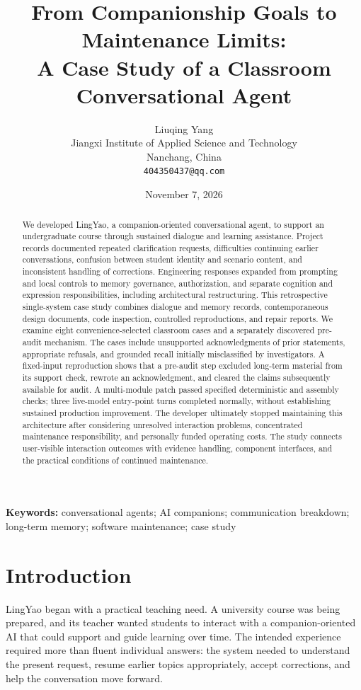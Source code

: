 \documentclass[11pt,a4paper]{article}
\title{From Companionship Goals to Maintenance Limits:\\
 A Case Study of a Classroom Conversational Agent}
\author{Liuqing Yang\\
 Jiangxi Institute of Applied Science and Technology\\
 Nanchang, China\\
 \texttt{404350437@qq.com}}
\date{November 7, 2026}
\begin{document}
\maketitle

\begin{abstract}
We developed LingYao, a companion-oriented conversational agent, to support an undergraduate course through sustained dialogue and learning assistance. Project records documented repeated clarification requests, difficulties continuing earlier conversations, confusion between student identity and scenario content, and inconsistent handling of corrections. Engineering responses expanded from prompting and local controls to memory governance, authorization, and separate cognition and expression responsibilities, including architectural restructuring. This retrospective single-system case study combines dialogue and memory records, contemporaneous design documents, code inspection, controlled reproductions, and repair reports. We examine eight convenience-selected classroom cases and a separately discovered pre-audit mechanism. The cases include unsupported acknowledgments of prior statements, appropriate refusals, and grounded recall initially misclassified by investigators. A fixed-input reproduction shows that a pre-audit step excluded long-term material from its support check, rewrote an acknowledgment, and cleared the claims subsequently available for audit. A multi-module patch passed specified deterministic and assembly checks; three live-model entry-point turns completed normally, without establishing sustained production improvement. The developer ultimately stopped maintaining this architecture after considering unresolved interaction problems, concentrated maintenance responsibility, and personally funded operating costs. The study connects user-visible interaction outcomes with evidence handling, component interfaces, and the practical conditions of continued maintenance.
\end{abstract}
\noindent\textbf{Keywords:} conversational agents; AI companions; communication breakdown; long-term memory; software maintenance; case study

\section{Introduction}
LingYao began with a practical teaching need. A university course was being prepared, and its teacher wanted students to interact with a companion-oriented AI that could support and guide learning over time. The intended experience required more than fluent individual answers: the system needed to understand the present request, resume earlier topics appropriately, accept corrections, and help the conversation move forward.
\end{document}
